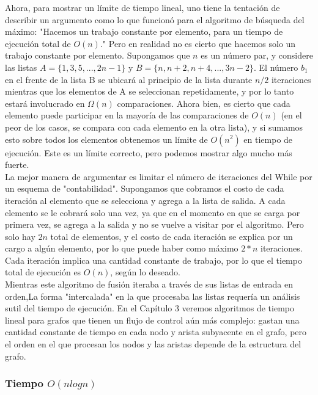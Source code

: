 \documentclass[a4paper]{article}
\begin{document}
Ahora, para mostrar un límite de tiempo lineal, uno tiene la tentación de describir un argumento como lo que funcionó para el algoritmo de búsqueda del máximo: "Hacemos un trabajo constante por elemento, para un tiempo de ejecución total de $O(n)$." Pero en realidad no es cierto que hacemos solo un trabajo constante por elemento. Supongamos que $n$ es un número par, y considere las listas $A =\{ 1, 3, 5,. . . , 2n-1\}$ y $B =\{ n, n + 2, n + 4,. . . , 3n-2 \}$. El número $b_1$ en el frente de la lista B se ubicará al principio de la lista durante $n / 2$ iteraciones mientras que los elementos de A se seleccionan repetidamente, y por lo tanto estará involucrado en $\Omega(n)$ comparaciones. Ahora bien, es cierto que cada elemento puede participar en la mayoría de las comparaciones de $O(n)$ (en el peor de los casos, se compara con cada elemento en la otra lista), y si sumamos esto sobre todos los elementos obtenemos un límite de $O(n^2)$ en tiempo de ejecución. Este es un límite correcto, pero podemos mostrar algo mucho más fuerte.\\

La mejor manera de argumentar es limitar el número de iteraciones del While por un esquema de "contabilidad". Supongamos que cobramos el costo de cada iteración al elemento que se selecciona y agrega a la lista de salida. A cada elemento se le cobrará solo una vez, ya que en el momento en que se carga por primera vez, se agrega a la salida y no se vuelve a visitar por el algoritmo. Pero solo hay $2n$ total de elementos, y el costo de cada iteración se explica por un cargo a algún elemento, por lo que puede haber como máximo $2*n$ iteraciones. Cada iteración implica una cantidad constante de trabajo, por lo que el tiempo total de ejecución es $O(n)$, según lo deseado.\\

 Mientras este algoritmo de fusión iteraba a través de sus listas de entrada en orden,La forma "intercalada" en la que procesaba las listas requería un análisis  sutil del tiempo de ejecución. En el Capítulo 3 veremos algoritmos de tiempo lineal para grafos que tienen un flujo de control aún más complejo: gastan una cantidad constante de tiempo en cada nodo y arista subyacente en el grafo, pero el orden en el que procesan los nodos y las aristas depende de la estructura del grafo.\\

\subsubsection*{Tiempo $O(nlogn)$} 
\end{document}
